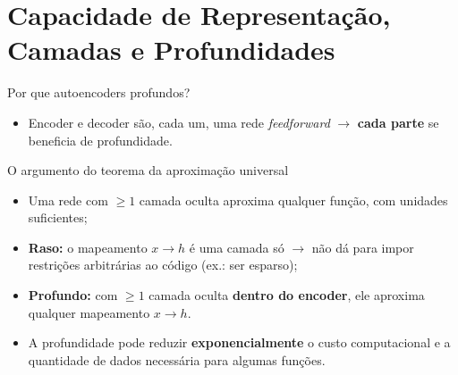 \documentclass[aspectratio=169,xcolor=dvipsnames]{beamer}
\begin{document}
\section{Capacidade de Representação, Camadas e Profundidades}

\begin{frame}{Por que autoencoders profundos?}
    \small
    \begin{itemize}
        \item Encoder e decoder são, cada um, uma rede \textit{feedforward} $\rightarrow$ \textbf{cada parte} se beneficia de profundidade.
    \end{itemize}
    \begin{block}{O argumento do teorema da aproximação universal}
        \begin{itemize}
            \item Uma rede com $\geq 1$ camada oculta aproxima qualquer função, com unidades suficientes;
            \item \textbf{Raso:} o mapeamento $x \rightarrow h$ é uma camada só $\rightarrow$ não dá para impor restrições arbitrárias ao código (ex.: ser esparso);
            \item \textbf{Profundo:} com $\geq 1$ camada oculta \textbf{dentro do encoder}, ele aproxima qualquer mapeamento $x \rightarrow h$.
        \end{itemize}
    \end{block}
    \begin{itemize}
        \item A profundidade pode reduzir \textbf{exponencialmente} o custo computacional e a quantidade de dados necessária para algumas funções.
    \end{itemize}
\end{frame}
 
\end{document}
